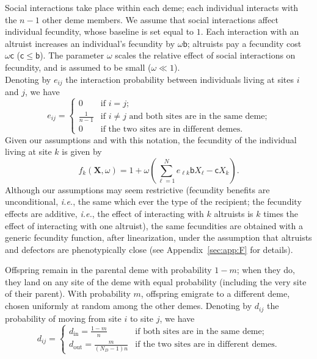 \documentclass[11pt, letterpaper]{article}
\newcommand{\ie}{\textit{i.e.}}
\newcommand{\appname}[0]{Appendix}
\newcommand{\bb}{\mathsf{b}}
\newcommand{\cc}{\mathsf{c}}
\newcommand{\din}{d_{\textrm{in}}}
\newcommand{\dout}{d_{\textrm{out}}}
\newcommand{\ndemes}{N_D}
\begin{document}
Social interactions take place within each deme; each individual interacts with the $n-1$ other deme members. We assume that social interactions affect individual fecundity, whose baseline is set equal to $1$. Each interaction with an altruist increases an individual's fecundity by $\omega \bb$; altruists pay a fecundity cost $\omega \cc$ ($\cc \leq \bb$). The parameter $\omega$ scales the relative effect of social interactions on fecundity, and is assumed to be small ($\omega \ll 1$). \\
Denoting by $e_{ij}$ the interaction probability between individuals living at sites $i$ and $j$, we have
%
\begin{equation}\label{eq:defE}
e_{ij} = \begin{cases}
 0 & \textrm{if $i=j$;}\\
 \frac{1}{n-1} & \textrm{if $i\neq j$ and both sites are in the same deme;}\\
 0 & \textrm{if the two sites are in different demes.} 
\end{cases}
\end{equation}
Given our assumptions and with this notation, the fecundity of the individual living at site $k$ is given by 
\begin{equation}\label{eq:deff}
f_k(\mathbf{X}, \omega) = 1 + \omega \left( \sum_{\ell =1}^N e_{\ell k} \bb X_{\ell} - \cc X_k \right).
\end{equation}
Although our assumptions may seem restrictive (fecundity benefits are unconditional, \ie, the same which ever the type of the recipient; the fecundity effects are additive, \ie, the effect of interacting with $k$ altruists is $k$ times the effect of interacting with one altruist), the same fecundities are obtained with a generic fecundity function, after linearization, under the assumption that altruists and defectors are phenotypically close (see \appname~\ref{sec:app:F} for details).

Offspring remain in the parental deme with probability $1-m$; when they do, they land on any site of the deme with equal probability (including the very site of their parent). With probability $m$, offspring emigrate to a different deme, chosen uniformly at random among the other demes. Denoting by $d_{ij}$ the probability of moving from site $i$ to site $j$, we have
\begin{equation}\label{eq:defD}
d_{ij} = \begin{cases}
 \din =  \frac{1-m}{n} & \textrm{if both sites are in the same deme;}\\
 \dout = \frac{m}{(\ndemes-1) n} & \textrm{if the two sites are in different demes.} 
\end{cases}
\end{equation}
\end{document}
